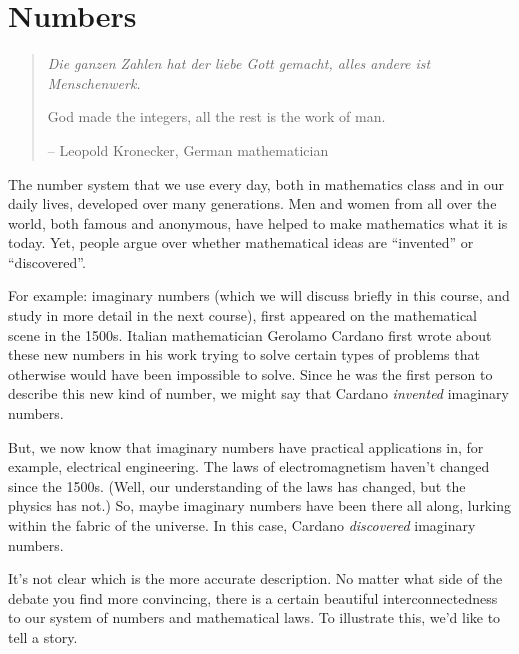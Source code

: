 \chapter{Numbers}
\label{ch:numbers}

\begin{quote}
{\em Die ganzen Zahlen hat der liebe Gott gemacht, alles andere ist Menschenwerk.}

God made the integers, all the rest is the work of man.

\hfill -- Leopold Kronecker, German mathematician
\end{quote}

\bigskip

The number system that we use every day, both in mathematics class and in our daily lives, developed over many generations. Men and women from all over the world, both famous and anonymous, have helped to make mathematics what it is today. Yet, people argue over whether mathematical ideas are ``invented'' or ``discovered''.

For example: \glspl{imaginary number} (which we will discuss briefly in this course, and study in more detail in the next course), first appeared on the mathematical scene in the 1500s. Italian mathematician Gerolamo Cardano first wrote about these new numbers in his work trying to solve certain types of problems that otherwise would have been impossible to solve. Since he was the first person to describe this new kind of number, we might say that Cardano {\em invented} imaginary numbers.

But, we now know that imaginary numbers have practical applications in, for example, electrical engineering. The laws of electromagnetism haven't changed since the 1500s. (Well, our understanding of the laws has changed, but the physics has not.) So, maybe imaginary numbers have been there all along, lurking within the fabric of the universe. In this case, Cardano {\em discovered} imaginary numbers.

It's not clear which is the more accurate description. No matter what side of the debate you find more convincing, there is a certain beautiful interconnectedness to our system of numbers and mathematical laws. To illustrate this, we'd like to tell a story.

